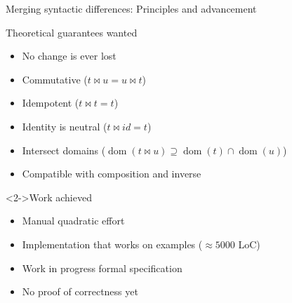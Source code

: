 \documentclass{beamer}
\newcommand\merge{\mathbin{\Join}}
\DeclareMathOperator\dom{dom}
\begin{document}
\begin{frame}{Merging syntactic differences: Principles and advancement}
\begin{block}{Theoretical guarantees wanted}
 \begin{itemize}
  \item No change is ever lost
  \item Commutative ($t \merge u = u \merge t$)
  \item Idempotent ($t \merge t = t$)
  \item Identity is neutral ($t \merge id = t$)
  \item Intersect domains ($\dom(t \merge u) \supseteq \dom(t) \cap \dom(u)$)
  \item Compatible with composition and inverse
 \end{itemize}
\end{block}

\begin{exampleblock}<2->{Work achieved}
 \begin{itemize}
  \item Manual quadratic effort
  \item Implementation that works on examples ($\approx 5000$ LoC)
  \item Work in progress formal specification
  \item No proof of correctness yet
 \end{itemize}
\end{exampleblock}
\end{frame}
\end{document}
